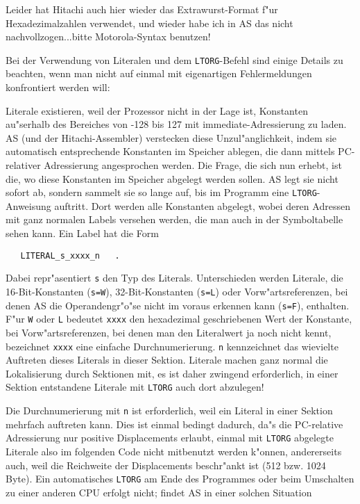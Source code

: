 \documentclass[12pt,a4paper,twoside]{report}
\newcommand{\tty}[1]{{\tt #1}}
\begin{document}
Leider hat Hitachi auch hier wieder das Extrawurst-Format f"ur
Hexadezimalzahlen verwendet, und wieder habe ich in AS das nicht
nachvollzogen...bitte Motorola-Syntax benutzen!
\par
Bei der Verwendung von Literalen und dem \tty{LTORG}-Befehl sind
einige Details zu beachten, wenn man nicht auf einmal mit eigenartigen
Fehlermeldungen konfrontiert werden will:
\par
Literale existieren, weil der Prozessor nicht in der Lage ist, Konstanten
au"serhalb des Bereiches von -128 bis 127 mit immediate-Adressierung
zu laden.  AS (und der Hitachi-Assembler) verstecken diese Unzul"anglichkeit,
indem sie automatisch entsprechende Konstanten im Speicher ablegen, die
dann mittels PC-relativer Adressierung angesprochen werden.  Die Frage, die
sich nun erhebt, ist die, wo diese Konstanten im Speicher abgelegt werden
sollen.  AS legt sie nicht sofort ab, sondern sammelt sie so lange
auf, bis im Programm eine \tty{LTORG}-Anweisung auftritt.  Dort werden
alle Konstanten abgelegt, wobei deren Adressen mit ganz normalen
Labels versehen werden, die man auch in der Symboltabelle sehen kann.
Ein Label hat die Form
\begin{verbatim}
   LITERAL_s_xxxx_n   .
\end{verbatim}
Dabei repr"asentiert \tty{s} den Typ des Literals.  Unterschieden werden
Literale, die 16-Bit-Konstanten (\tty{s=W}), 32-Bit-Konstanten (\tty{s=L})
oder Vorw"artsreferenzen, bei denen AS die Operandengr"o"se nicht
im voraus erkennen kann (\tty{s=F}), enthalten.  F"ur \tty{W} oder \tty{L}
bedeutet \tty{xxxx} den hexadezimal geschriebenen Wert der Konstante, bei
Vorw"artsreferenzen, bei denen man den Literalwert ja noch nicht kennt,
bezeichnet \tty{xxxx} eine einfache Durchnumerierung. \tty{n} kennzeichnet
das wievielte Auftreten dieses Literals in dieser Sektion.  Literale machen
ganz normal die Lokalisierung durch Sektionen mit, es ist daher zwingend
erforderlich, in einer Sektion entstandene Literale mit \tty{LTORG} auch
dort abzulegen!
\par
Die Durchnumerierung mit \tty{n} ist erforderlich, weil ein Literal in
einer Sektion mehrfach auftreten kann.  Dies ist einmal bedingt dadurch,
da"s die PC-relative Adressierung nur positive Displacements erlaubt,
einmal mit \tty{LTORG} abgelegte Literale also im folgenden Code nicht
mitbenutzt werden k"onnen, andererseits auch, weil die Reichweite der
Displacements beschr"ankt ist (512 bzw. 1024 Byte).
Ein automatisches \tty{LTORG} am Ende des Programmes oder beim Umschalten
zu einer anderen CPU erfolgt nicht; findet AS in einer solchen Situation
\end{document}
